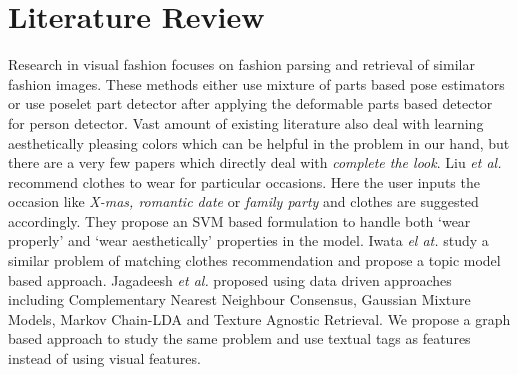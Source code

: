 \chapter{Literature Review}

Research in visual fashion focuses on fashion parsing and retrieval of similar fashion images\cite{clothParsing}. These methods either use mixture of parts based pose estimators or use poselet part detector after applying the deformable parts based detector for person detector. Vast amount of existing literature also deal with learning aesthetically pleasing colors which can be helpful in the problem in our hand, but there are a very few papers which directly deal with \textit{complete the look}. Liu \textit{et al.}\cite{magicCloset} recommend clothes to wear for particular occasions. Here the user inputs the occasion like \textit{X-mas, romantic date} or \textit{family party} and clothes are suggested accordingly. They propose an SVM based formulation to handle both `wear properly' and `wear aesthetically' properties in the model. Iwata \textit{el at.}\cite{fashionCoordinates} study a similar problem of matching clothes recommendation and propose a topic model based approach. Jagadeesh \textit{et al.}\cite{visualReco} proposed using data driven approaches including Complementary Nearest Neighbour Consensus, Gaussian Mixture Models, Markov Chain-LDA and Texture Agnostic Retrieval. We propose a graph based approach to study the same problem and use textual tags as features instead of using visual features.
